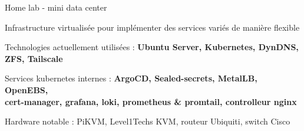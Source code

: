 
\begin{cventries}
  \cventry
    {} %
    {Home lab - mini data center} %
    {} %
    {} %
    {
      \begin{cvitems} %
        \item {Infrastructure virtualisée pour implémenter des services variés de manière flexible}
        \item {Technologies actuellement utilisées : \textbf{Ubuntu Server, Kubernetes, DynDNS, ZFS, Tailscale}}
        \item {Services kubernetes internes : \textbf{ArgoCD, Sealed-secrets, MetalLB, OpenEBS,\\cert-manager, grafana, loki, prometheus \& promtail, controlleur nginx}}
        \item {Hardware notable : PiKVM, Level1Techs KVM, routeur Ubiquiti, switch Cisco\\}
      \end{cvitems}
    }
  


\end{cventries}

